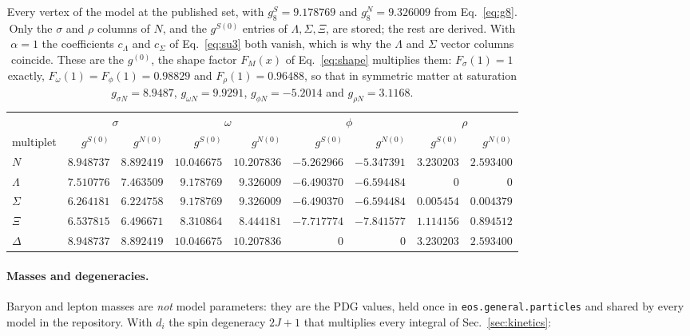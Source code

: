 \documentclass[aps,prc,onecolumn,superscriptaddress,nofootinbib,10pt]{revtex4-2}
\begin{document}
\begin{table}[h]
\centering
\begin{tabular}{lrrrrrrrr}
\toprule
& \multicolumn{2}{c}{$\sigma$} & \multicolumn{2}{c}{$\omega$}
& \multicolumn{2}{c}{$\phi$} & \multicolumn{2}{c}{$\rho$} \\
\cmidrule(lr){2-3}\cmidrule(lr){4-5}\cmidrule(lr){6-7}\cmidrule(lr){8-9}
multiplet & $g^{S(0)}$ & $g^{N(0)}$ & $g^{S(0)}$ & $g^{N(0)}$
          & $g^{S(0)}$ & $g^{N(0)}$ & $g^{S(0)}$ & $g^{N(0)}$ \\
\midrule
$N$        & $8.948737$ & $8.892419$ & $10.046675$ & $10.207836$ & $-5.262966$ & $-5.347391$ & $3.230203$ & $2.593400$ \\
$\Lambda$  & $7.510776$ & $7.463509$ & $9.178769$  & $9.326009$  & $-6.490370$ & $-6.594484$ & $0$ & $0$ \\
$\Sigma$   & $6.264181$ & $6.224758$ & $9.178769$  & $9.326009$  & $-6.490370$ & $-6.594484$ & $0.005454$ & $0.004379$ \\
$\Xi$      & $6.537815$ & $6.496671$ & $8.310864$  & $8.444181$  & $-7.717774$ & $-7.841577$ & $1.114156$ & $0.894512$ \\
$\Delta$   & $8.948737$ & $8.892419$ & $10.046675$ & $10.207836$ & $0$ & $0$ & $3.230203$ & $2.593400$ \\
\bottomrule
\end{tabular}
\caption{Every vertex of the model at the published set, with
$g_8^S = 9.178769$ and $g_8^N = 9.326009$ from Eq.~\eqref{eq:g8}. Only the
$\sigma$ and $\rho$ columns of $N$, and the $g^{S(0)}$ entries of
$\Lambda,\Sigma,\Xi$, are stored; the rest are derived. With $\alpha = 1$ the
coefficients $c_\Lambda$ and $c_\Sigma$ of Eq.~\eqref{eq:su3} both vanish, which
is why the $\Lambda$ and $\Sigma$ vector columns coincide. These are the
$g^{(0)}$, the shape factor $F_M(x)$ of Eq.~\eqref{eq:shape} multiplies them:
$F_\sigma(1) = 1$ exactly, $F_\omega(1) = F_\phi(1) = 0.98829$ and
$F_\rho(1) = 0.96488$, so that in symmetric matter at saturation
$g_{\sigma N} = 8.9487$, $g_{\omega N} = 9.9291$, $g_{\phi N} = -5.2014$ and
$g_{\rho N} = 3.1168$.}
\end{table}

\paragraph{Masses and degeneracies.} Baryon and lepton masses are \emph{not}
model parameters: they are the PDG values, held once in
\texttt{eos.general.particles} and shared by every model in the repository. With
$d_i$ the spin degeneracy $2J+1$ that multiplies every integral of
Sec.~\ref{sec:kinetics}:
\end{document}
